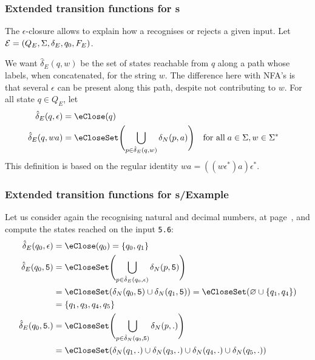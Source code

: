 % 
\begin{frame}
\frametitle{Extended transition functions for {\eNFA}s}

The \(\epsilon\)-closure allows to explain how a \eNFA recognises or
rejects a given input. Let \({\cal E} = (Q_E, \Sigma, \delta_E, q_0,
F_E)\).

\bigskip

We want \(\hat{\delta}_E (q, w)\) be the set of states reachable from
\(q\) along a path whose labels, when concatenated, for the string
\(w\). The difference here with NFA's is that several \(\epsilon\) can
be present along this path, despite not contributing to \(w\).
For all state \(q \in Q_E\), let
\begin{align*}
   \hat{\delta}_E (q, \epsilon)
&= \eClose (q)\\
   \hat{\delta}_E (q, wa)
&= \eCloseSet \Biggl(\bigcup_{p \in \hat{\delta}_E (q, w)}{\delta_N (p,
     a)}\Biggr)
&& \text{for all} \; a \in \Sigma, w \in \Sigma^{*}
\end{align*}
This definition is based on the regular identity \(wa =
((w\epsilon^{*})a)\epsilon^{*}\).

\end{frame}

% 
\begin{frame}[containsverbatim]
\frametitle{Extended transition functions for {\eNFA}s/Example}

Let us consider again the \eNFA recognising natural and decimal
numbers, at page~\pageref{enfa_num}, and compute the states reached on
the input \verb+5.6+:
\begin{align*}
   \hat{\delta}_E (q_0, \epsilon)
&= \eClose (q_0) = \{q_0, q_1\}\\
   \hat{\delta}_E (q_0, \mathtt{5})
&= \eCloseSet \Biggl( \bigcup_{p \in \hat{\delta}_E (q_0,
   \epsilon)}{\delta_N (p, \mathtt{5})} \Biggr)\\
&= \eCloseSet (\delta_N (q_0, \mathtt{5}) \cup \delta_N (q_1,
   \mathtt{5})) = \eCloseSet (\varnothing \cup \{q_1, q_4\})\\
&= \{q_1, q_3, q_4, q_5\}\\
   \hat{\delta}_E (q_0, \mathtt{5.})
&= \eCloseSet \Biggl( \bigcup_{p \in \hat{\delta}_N (q_0,
   \mathtt{5})}{\delta_N (p, \mathtt{.})} \Biggr)\\
&= \eCloseSet (\delta_N (q_1, \mathtt{.}) \cup \delta_N (q_3,
   \mathtt{.}) \cup \delta_N (q_4, \mathtt{.}) \cup \delta_N (q_5,
   \mathtt{.}))
\end{align*}

\end{frame}

